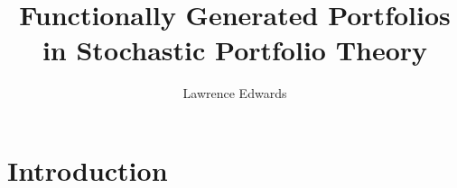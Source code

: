 \documentclass[british]{amsart}
\numberwithin{equation}{section}
\numberwithin{figure}{section}
\theoremstyle{plain}
\theoremstyle{definition}
\theoremstyle{plain}
\theoremstyle{plain}
\theoremstyle{plain}
\theoremstyle{remark}
\theoremstyle{plain}
\begin{document}
\title{Functionally Generated Portfolios in Stochastic Portfolio Theory}
\author{Lawrence Edwards}
\maketitle

\tableofcontents{}

\section{Introduction}
% 
% 
% 
% 
% 
% 
\end{document}
